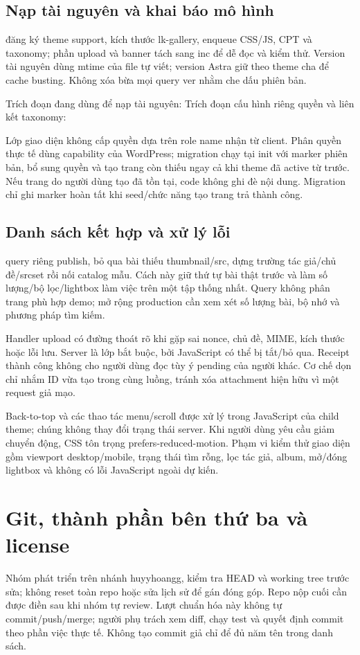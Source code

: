 \subsection{Nạp tài nguyên và khai báo mô hình}
 đăng ký theme support, kích thước lk-gallery, enqueue CSS/JS, CPT và taxonomy; phần upload và banner tách sang inc để dễ đọc và kiểm thử. Version tài nguyên dùng mtime của file tự viết; version Astra giữ theo theme cha để cache busting. Không xóa bừa mọi query ver nhằm che dấu phiên bản.

Trích đoạn đang dùng để nạp tài nguyên:
Trích đoạn cấu hình riêng quyền và liên kết taxonomy:

Lớp giao diện không cấp quyền dựa trên role name nhận từ client. Phân quyền thực tế dùng capability của WordPress; migration chạy tại init với marker phiên bản, bổ sung quyền và tạo trang còn thiếu ngay cả khi theme đã active từ trước. Nếu trang do người dùng tạo đã tồn tại, code không ghi đè nội dung. Migration chỉ ghi marker hoàn tất khi seed/chức năng tạo trang trả thành công.

\subsection{Danh sách kết hợp và xử lý lỗi}
 query riêng publish, bỏ qua bài thiếu thumbnail/src, dựng trường tác giả/chủ đề/srcset rồi nối catalog mẫu. Cách này giữ thứ tự bài thật trước và làm số lượng/bộ lọc/lightbox làm việc trên một tập thống nhất. Query không phân trang phù hợp demo; mở rộng production cần xem xét số lượng bài, bộ nhớ và phương pháp tìm kiếm.

Handler upload có đường thoát rõ khi gặp sai nonce, chủ đề, MIME, kích thước hoặc lỗi lưu. Server là lớp bắt buộc, bởi JavaScript có thể bị tắt/bỏ qua. Receipt thành công không cho người dùng đọc tùy ý pending của người khác. Cơ chế dọn chỉ nhắm ID vừa tạo trong cùng luồng, tránh xóa attachment hiện hữu vì một request giả mạo.

Back-to-top và các thao tác menu/scroll được xử lý trong JavaScript của child theme; chúng không thay đổi trạng thái server. Khi người dùng yêu cầu giảm chuyển động, CSS tôn trọng prefers-reduced-motion. Phạm vi kiểm thử giao diện gồm viewport desktop/mobile, trạng thái tìm rỗng, lọc tác giả, album, mở/đóng lightbox và không có lỗi JavaScript ngoài dự kiến.

\section{Git, thành phần bên thứ ba và license}
Nhóm phát triển trên nhánh huyyhoangg, kiểm tra HEAD và working tree trước sửa; không reset toàn repo hoặc sửa lịch sử để gán đóng góp. Repo nộp cuối cần được điền sau khi nhóm tự review. Lượt chuẩn hóa này không tự commit/push/merge; người phụ trách xem diff, chạy test và quyết định commit theo phần việc thực tế. Không tạo commit giả chỉ để đủ năm tên trong danh sách.

